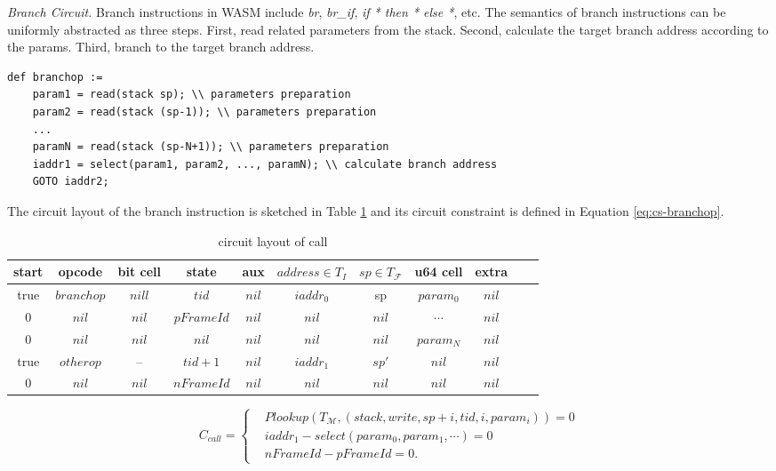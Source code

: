 \smallskip\noindent\emph{Branch Circuit.}
Branch instructions in WASM include \emph{br}, \emph{br\_if}, \emph{if * then * else *}, etc. The semantics of branch instructions can be uniformly abstracted as three steps. First, read related parameters from the stack. Second, calculate the target branch address according to the params. Third, branch to the target branch address.
\begin{verbatim}
def branchop :=
    param1 = read(stack sp); \\ parameters preparation
    param2 = read(stack (sp-1)); \\ parameters preparation
    ...
    paramN = read(stack (sp-N+1)); \\ parameters preparation
    iaddr1 = select(param1, param2, ..., paramN); \\ calculate branch address
    GOTO iaddr2;
\end{verbatim}
\smallskip The circuit layout of the branch instruction is sketched in Table \ref{tbl:branch-instruction} and its circuit constraint is defined in Equation \ref{eq:cs-branchop}. 
\begin{table}[!h]
\begin{center}
\begin{tabular}{ | c | c | c | c | c | c | c | c | c | c | c | }
  \hline
  start & opcode & bit cell & state & aux & $address \in T_{I}$ & $sp \in T_\mathcal{F}$& u64 cell & extra \\ 
  \hline
   true & $branchop$ & $nill$ & $tid$ & $nil$ & $iaddr_0$ & sp & $param_0$ & $nil$\\ 
 \hline
   0 & $nil$ & $nil$ & $pFrameId$ & $nil$ & $nil$ & $nil$ & $\cdots$ & $nil$\\ 
 \hline
   0 & $nil$ & $nil$ & $nil$ & $nil$ & $nil$ & $nil$ & $param_N$ & $nil$\\ 
 \hline
   true & $otherop$ & -- & $tid + 1$ & $nil$ & $iaddr_1$ & $sp'$ & $nil$ & $nil$\\
 \hline
   0 & $nil$ & $nil$ & $nFrameId$ & $nil$ & $nil$ & $nil$ & $nil$ & $nil$\\ 
 \hline
\end{tabular}
\caption{circuit layout of call}
\label{tbl:branch-instruction}
\end{center}
\end{table}
\begin{equation}
    C_{call} = \begin{cases}
        &Plookup(T_\mathcal{M}, (stack, write, sp+i, tid, i, param_i)) = 0 \\
        &iaddr_1 - select(param_0, param_1, \cdots) = 0 \\
        &nFrameId - pFrameId = 0.
    \end{cases}
\label{eq:cs-branchop}
\end{equation}

